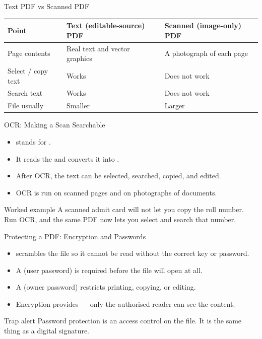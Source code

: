 \documentclass[aspectratio=169]{beamer}
\begin{document}
\begin{frame}{Text PDF vs Scanned PDF}
  \begin{center}
    \begin{tabular}{p{}p{}p{}}
      \toprule
      \textbf{Point} & \textbf{Text (editable-source) PDF} & \textbf{Scanned (image-only) PDF} \\
      \midrule
      Page contents & Real text and vector graphics & A photograph of each page \\
      Select / copy text & Works & Does not work \\
      Search text & Works & Does not work \\
      File usually & Smaller & Larger \\
      \bottomrule
    \end{tabular}
  \end{center}
  \vspace{0.25cm}
\end{frame}

\begin{frame}{OCR: Making a Scan Searchable}
  \begin{itemize}
    \item {} stands for .
    \item It reads the  and converts it into
      .
    \item After OCR, the text can be selected, searched, copied, and edited.
    \item OCR is run on scanned pages and on photographs of documents.
  \end{itemize}
  \begin{exampleblock}{Worked example}
    A scanned admit card will not let you copy the roll number. Run OCR, and
    the same PDF now lets you select and search that number.
  \end{exampleblock}
\end{frame}

\begin{frame}{Protecting a PDF: Encryption and Passwords}
  \begin{itemize}
    \item {} scrambles the file so it cannot be read without
      the correct key or password.
    \item A  (user password) is required before the
      file will open at all.
    \item A  (owner password) restricts printing,
      copying, or editing.
    \item Encryption provides  --- only the authorised
      reader can see the content.
  \end{itemize}
  \begin{alertblock}{Trap alert}
    Password protection is an access control on the file. It is 
    the same thing as a digital signature.
  \end{alertblock}
\end{frame}
\end{document}
